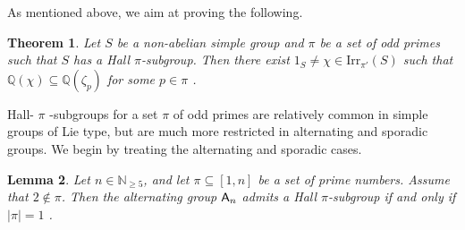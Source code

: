 \documentclass[12pt]{amsart}
\newtheorem{theorem}{Theorem}[section]
\newtheorem{lemma}[theorem]{Lemma}
\theoremstyle{definition}
\numberwithin{equation}{section}
\newcommand{\Irr}{{\mathrm {Irr}}}
\newcommand{\QQ}{{\mathbb Q}}
\newcommand{\Al}{\textup{\textsf{A}}}
\begin{document}
As mentioned above, we aim at %
proving the following.

\begin{theorem}\label{thm:simple}
Let %
$S$ be a non-abelian simple group and $\pi$ be a set of odd
primes such that $S$ has a Hall $\pi$-subgroup. Then %
there exist
$1_S\neq\chi\in\Irr_{\pi'}(S)$ %
such that
$\QQ(\chi)\subseteq\QQ(\zeta_p)$ for some $p\in\pi$%
.
\end{theorem}


Hall- $\pi$%
-subgroups for a set $\pi$ of odd primes are relatively
common in simple groups of Lie type, but are much more restricted in
alternating and sporadic groups. We begin by treating the
alternating and sporadic cases.

\begin{lemma}\label{lem:noHall}
Let $n\in\mathbb{N}_{\geq 5}$, and %
let $\pi\subseteq [1,n]$ be a set
of prime numbers. Assume that $2\notin\pi$. Then the alternating
group $\Al_n$ admits a Hall $\pi$-subgroup if and only if $|\pi|=1$%
.
\end{lemma}
\end{document}
